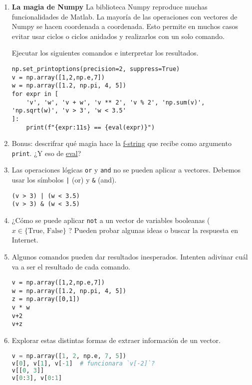 \documentclass[a4paper,11pt]{article}
\theoremstyle{definition}
\begin{document}
\begin{enumerate}
\begin{lstlisting}
import numpy as np
v = np.array([1,2,3])
w = np.array([1.2, 7, np.pi])
v, w, v + w
\end{lstlisting}

\item \textbf{La magia de Numpy} La biblioteca Numpy reproduce muchas funcionalidades de Matlab. La mayoría de las operaciones con vectores de Numpy se hacen coordenada a coordenada. Esto permite en muchos casos evitar usar ciclos o ciclos anidados y realizarlos con un solo comando.

Ejecutar los siguientes comandos e interpretar los resultados.

\begin{lstlisting}
np.set_printoptions(precision=2, suppress=True)
v = np.array([1,2,np.e,7])
w = np.array([1.2, np.pi, 4, 5])
for expr in [
    'v', 'w', 'v + w', 'v ** 2', 'v % 2', 'np.sum(v)', 'np.sqrt(w)', 'v > 3', 'w < 3.5'
]:
    print(f"{expr:11s} == {eval(expr)}")
\end{lstlisting}

\item Bonus: descrifrar qué magia hace la 
\href{https://docs.python.org/es/3.11/tutorial/inputoutput.html\#tut-f-strings}{f-string} que recibe como argumento \lstinline{print}. ¿Y eso de \href{https://docs.python.org/es/3.11/library/functions.html\#eval}{eval}?

\item Las operaciones lógicas \lstinline{or} y \lstinline{and} no se pueden aplicar a vectores. Debemos usar los símbolos \lstinline{|} (or) y \lstinline{&} (and).
\begin{lstlisting}
(v > 3) | (w < 3.5)
(v > 3) & (w < 3.5)
\end{lstlisting}

\item ¿Cómo se puede aplicar \lstinline{not} a un vector de variables booleanas ( $x \in \{\text{True, False}\}$ ? Pueden probar algunas ideas o buscar la respuesta en Internet.

\item Algunos comandos pueden dar resultados inesperados. Intenten adivinar cuál va a ser el resultado de cada comando.
\begin{lstlisting}
v = np.array([1,2,np.e,7])
w = np.array([1.2, np.pi, 4, 5])
z = np.array([0,1])
v * w
v+2
v+z
\end{lstlisting}

\item Explorar estas distintas formas de extraer información de un vector.
\begin{lstlisting}[language=Python]
v = np.array([1, 2, np.e, 7, 5])
v[0], v[1], v[-1]  # funcionara `v[-2]`?
v[[0, 3]]
v[0:3], v[0:1]
\end{lstlisting}


\end{enumerate}
\end{document}
